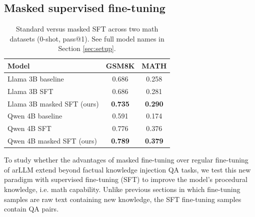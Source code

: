 \subsection{Masked supervised fine-tuning}
\label{sec:sft}

\begin{table}[h]
  \caption{Standard versus masked SFT across two math datasets (0-shot, pass@1). See full model names in Section \ref{sec:setup}.}
  \label{tab:sft}
  \vskip 0.0in
  \begin{center}
    {\fontsize{8}{9}\selectfont
        \setlength{\tabcolsep}{4pt}
        \begin{tabular}{lcc}
          \toprule
          Model & GSM8K & MATH \\
          \midrule
          Llama 3B baseline            & 0.686 & 0.258 \\
          Llama 3B SFT                 & 0.686 & 0.281 \\
          Llama 3B masked SFT (ours)   & \textbf{0.735} & \textbf{0.290} \\
          \midrule
          Qwen 4B baseline             & 0.591 & 0.174 \\
          Qwen 4B SFT                  & 0.776 & 0.376 \\
          Qwen 4B masked SFT (ours)    & \textbf{0.789} & \textbf{0.379} \\
          \bottomrule
        \end{tabular}
    }
  \end{center}
\end{table}


To study whether the advantages of masked fine-tuning over regular fine-tuning of arLLM extend beyond factual knowledge injection QA tasks, we test this new paradigm with supervised fine-tuning (SFT) to improve the model's procedural knowledge, i.e. math capability. Unlike previous sections in which fine-tuning samples are raw text containing new knowledge, the SFT fine-tuning samples contain QA pairs. 

